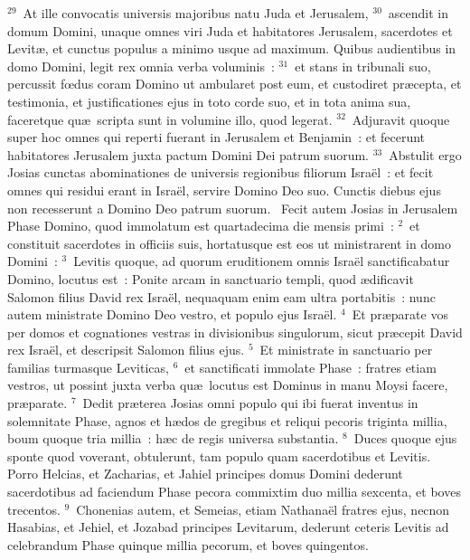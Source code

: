 ${}^{29}$~At ille convocatis universis majoribus natu Juda et Jerusalem,
${}^{30}$~ascendit in domum Domini, unaque omnes viri Juda et habitatores Jerusalem, sacerdotes et Levit\ae , et cunctus populus a minimo usque ad maximum. Quibus audientibus in domo Domini, legit rex omnia verba voluminis~:
${}^{31}$~et stans in tribunali suo, percussit fœdus coram Domino ut ambularet post eum, et custodiret pr\ae cepta, et testimonia, et justificationes ejus in toto corde suo, et in tota anima sua, faceretque qu\ae\ scripta sunt in volumine illo, quod legerat.
${}^{32}$~Adjuravit quoque super hoc omnes qui reperti fuerant in Jerusalem et Benjamin~: et fecerunt habitatores Jerusalem juxta pactum Domini Dei patrum suorum.
${}^{33}$~Abstulit ergo Josias cunctas abominationes de universis regionibus filiorum Isra\"el~: et fecit omnes qui residui erant in Isra\"el, servire Domino Deo suo. Cunctis diebus ejus non recesserunt a Domino Deo patrum suorum.
~\lettrine[lines=10,image=true,loversize=0.05,lraise=-0.03]{F}{}ecit autem Josias in Jerusalem Phase Domino, quod immolatum est quartadecima die mensis primi~:
${}^{2}$~et constituit sacerdotes in officiis suis, hortatusque est eos ut ministrarent in domo Domini~:
${}^{3}$~Levitis quoque, ad quorum eruditionem omnis Isra\"el sanctificabatur Domino, locutus est~: Ponite arcam in sanctuario templi, quod \ae dificavit Salomon filius David rex Isra\"el, nequaquam enim eam ultra portabitis~: nunc autem ministrate Domino Deo vestro, et populo ejus Isra\"el.
${}^{4}$~Et pr\ae parate vos per domos et cognationes vestras in divisionibus singulorum, sicut pr\ae cepit David rex Isra\"el, et descripsit Salomon filius ejus.
${}^{5}$~Et ministrate in sanctuario per familias turmasque Leviticas,
${}^{6}$~et sanctificati immolate Phase~: fratres etiam vestros, ut possint juxta verba qu\ae\ locutus est Dominus in manu Moysi facere, pr\ae parate.
${}^{7}$~Dedit pr\ae terea Josias omni populo qui ibi fuerat inventus in solemnitate Phase, agnos et h\ae dos de gregibus et reliqui pecoris triginta millia, boum quoque tria millia~: h\ae c de regis universa substantia.
${}^{8}$~Duces quoque ejus sponte quod voverant, obtulerunt, tam populo quam sacerdotibus et Levitis. Porro Helcias, et Zacharias, et Jahiel principes domus Domini dederunt sacerdotibus ad faciendum Phase pecora commixtim duo millia sexcenta, et boves trecentos.
${}^{9}$~Chonenias autem, et Semeias, etiam Nathana\"el fratres ejus, necnon Hasabias, et Jehiel, et Jozabad principes Levitarum, dederunt ceteris Levitis ad celebrandum Phase quinque millia pecorum, et boves quingentos.

